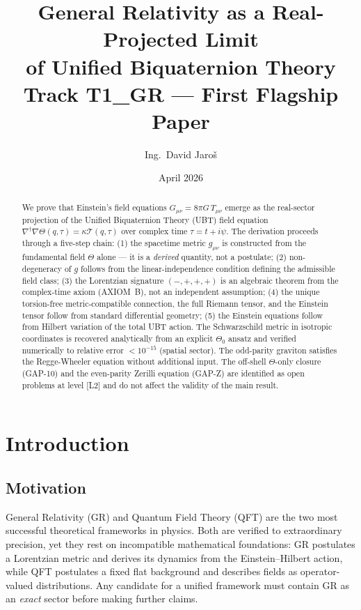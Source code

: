 \documentclass[12pt,a4paper]{article}
\title{\textbf{General Relativity as a Real-Projected Limit\\
  of Unified Biquaternion Theory}\\[6pt]
  \large Track T1\_GR — First Flagship Paper}
\author{Ing.\ David Jaroš}
\date{April 2026}
\theoremstyle{definition}
\theoremstyle{remark}
\newcommand{\Gmn}{G_{\mu\nu}}
\newcommand{\gmn}{g_{\mu\nu}}
\newcommand{\Tmn}{T_{\mu\nu}}
\begin{document}
\maketitle

\begin{abstract}
We prove that Einstein's field equations $\Gmn = 8\pi G\,\Tmn$ emerge as the
real-sector projection of the Unified Biquaternion Theory (UBT) field equation
$\nabla^\dagger\nabla\Theta(q,\tau)=\kappa\mathcal{T}(q,\tau)$ over complex time
$\tau = t + i\psi$.  The derivation proceeds through a five-step chain:
(1) the spacetime metric $\gmn$ is constructed from the fundamental field $\Theta$
alone — it is a \emph{derived} quantity, not a postulate; (2) non-degeneracy of
$g$ follows from the linear-independence condition defining the admissible field
class; (3) the Lorentzian signature $(-,+,+,+)$ is an algebraic theorem from the
complex-time axiom (AXIOM~B), not an independent assumption; (4) the unique
torsion-free metric-compatible connection, the full Riemann tensor, and the
Einstein tensor follow from standard differential geometry; (5) the Einstein
equations follow from Hilbert variation of the total UBT action.  The Schwarzschild
metric in isotropic coordinates is recovered analytically from an explicit
$\Theta_0$ ansatz and verified numerically to relative error $<10^{-15}$ (spatial
sector).  The odd-parity graviton satisfies the Regge-Wheeler equation without
additional input.  The off-shell $\Theta$-only closure (GAP-10) and the even-parity
Zerilli equation (GAP-Z) are identified as open problems at level [L2] and do not
affect the validity of the main result.
\end{abstract}

\tableofcontents

\section{Introduction}
\label{sec:intro}

\subsection{Motivation}
\label{sec:motivation}

General Relativity (GR) and Quantum Field Theory (QFT) are the two most
successful theoretical frameworks in physics.  Both are verified to extraordinary
precision, yet they rest on incompatible mathematical foundations: GR postulates a
Lorentzian metric and derives its dynamics from the Einstein--Hilbert action, while
QFT postulates a fixed flat background and describes fields as operator-valued
distributions.  Any candidate for a unified framework must contain GR as an
\emph{exact} sector before making further claims.
\end{document}
